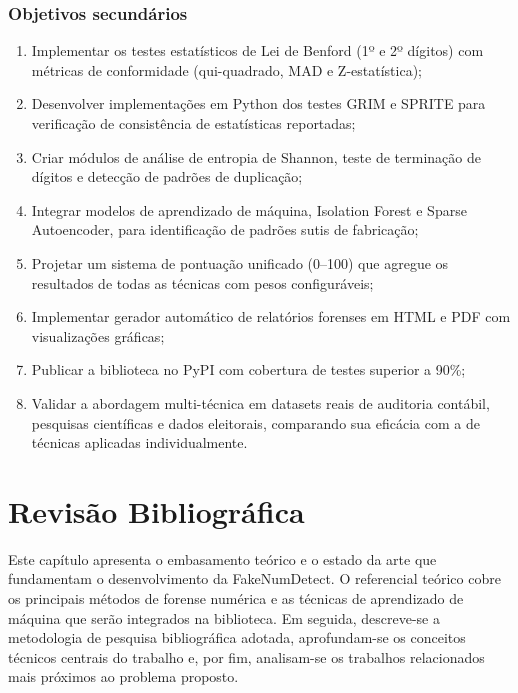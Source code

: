 \documentclass[
    12pt,                %
    openright,           %
    oneside,             %
    a4paper,             %
    english,             %
    brazil               %
]{abntex2}
\begin{document}
\subsection{Objetivos secundários}

\begin{enumerate}
    \item Implementar os testes estatísticos de Lei de Benford (1º e 2º dígitos) com métricas de conformidade (qui-quadrado, MAD e Z-estatística);
    \item Desenvolver implementações em Python dos testes GRIM e SPRITE para verificação de consistência de estatísticas reportadas;
    \item Criar módulos de análise de entropia de Shannon, teste de terminação de dígitos e detecção de padrões de duplicação;
    \item Integrar modelos de aprendizado de máquina, Isolation Forest e Sparse Autoencoder, para identificação de padrões sutis de fabricação;
    \item Projetar um sistema de pontuação unificado (0--100) que agregue os resultados de todas as técnicas com pesos configuráveis;
    \item Implementar gerador automático de relatórios forenses em HTML e PDF com visualizações gráficas;
    \item Publicar a biblioteca no PyPI com cobertura de testes superior a 90\%;
    \item Validar a abordagem multi-técnica em datasets reais de auditoria contábil, pesquisas científicas e dados eleitorais, comparando sua eficácia com a de técnicas aplicadas individualmente.
\end{enumerate}

\chapter{Revisão Bibliográfica}
\label{cap:revisao}

Este capítulo apresenta o embasamento teórico e o estado da arte que fundamentam o desenvolvimento da FakeNumDetect. O referencial teórico cobre os principais métodos de forense numérica e as técnicas de aprendizado de máquina que serão integrados na biblioteca. Em seguida, descreve-se a metodologia de pesquisa bibliográfica adotada, aprofundam-se os conceitos técnicos centrais do trabalho e, por fim, analisam-se os trabalhos relacionados mais próximos ao problema proposto.
\end{document}
